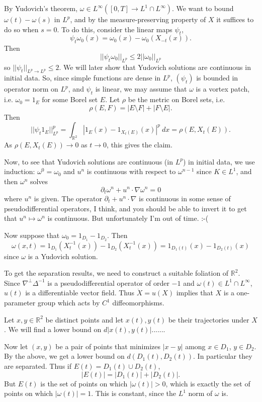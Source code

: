 \documentclass[10pt]{article}
\newcommand{\RR}{\mathbb{R}}
\theoremstyle{definition}
\begin{document}
By Yudovich's theorem, $\omega \in L^\infty([0, T] \to L^1 \cap L^\infty)$.
We want to bound $\omega(t) - \omega(s)$ in $L^p$, and by the measure-preserving property of $X$ it suffices to do so when $s = 0$.
To do this, consider the linear maps $\psi_t$,
$$\psi_t \omega_0(x) = \omega_0(x) - \omega_0(X_{-t}(x)).$$
Then
$$||\psi_t \omega_0||_{L^p} \leq 2||\omega_0||_{L^p}$$
so $||\psi_t||_{L^p \to L^p} \leq 2$.
We will later show that Yudovich solutions are continuous in initial data.
So, since simple functions are dense in $L^p$, $(\psi_t)$ is bounded in operator norm on $L^p$, and $\psi_t$ is linear, we may assume that $\omega$ is a vortex patch, i.e. $\omega_0 = 1_E$ for some Borel set $E$.
Let $\rho$ be the metric on Borel sets, i.e.
$$\rho(E, F) = |E \setminus F| + |F \setminus E|.$$
Then
$$||\psi_t 1_E||_{L^p}^p = \int_{\RR^2} |1_E(x) - 1_{X_t(E)}(x)|^p ~dx = \rho(E, X_t(E)).$$
As $\rho(E, X_t(E)) \to 0$ as $t \to 0$, this gives the claim.

Now, to see that Yudovich solutions are continuous (in $L^p$) in initial data, we use induction: $\omega^0 = \omega_0$ and $u^n$ is continuous with respect to $\omega^{n - 1}$ since $K \in L^1$, and then $\omega^n$ solves
$$\partial_t \omega^n + u^n \cdot \nabla \omega^n = 0$$
where $u^n$ is given. The operator $\partial_t + u^n \cdot \nabla$ is continuous in some sense of pseudodifferential operators, I think, and you should be able to invert it to get that $u^n \mapsto \omega^n$ is continuous.
But unfortunately I'm out of time. :-(



Now suppose that $\omega_0 = 1_{D_1} - 1_{D_2}$.
Then
$$\omega(x, t) = 1_{D_1}(X_t^{-1}(x)) - 1_{D_2}(X_t^{-1}(x)) = 1_{D_1(t)}(x) - 1_{D_2(t)}(x)$$
since $\omega$ is a Yudovich solution.

To get the separation results, we need to construct a suitable foliation of $\RR^2$.
Since $\nabla^\perp \Delta^{-1}$ is a pseudodifferential operator of order $-1$ and $\omega(t) \in L^1 \cap L^\infty$, $u(t)$ is a differentiable vector field.
Thus $\dot X = u(X)$ implies that $X$ is a one-parameter group which acts by $C^1$ diffeomorphisms.

Let $x,y \in \RR^2$ be distinct points and let $x(t),y(t)$ be their trajectories under $X$. We will find a lower bound on $d|x(t), y(t)|$.......

Now let $(x, y)$ be a pair of points that minimizes $|x - y|$ among $x \in D_1$, $y \in D_2$.
By the above, we get a lower bound on $d(D_1(t), D_2(t))$.
In particular they are separated.
Thus if $E(t) = D_1(t) \cup D_2(t)$,
$$|E(t)| = |D_1(t)| + |D_2(t)|.$$
But $E(t)$ is the set of points on which $|\omega(t)| > 0$, which is exactly the set of points on which $|\omega(t)| = 1$.
This is constant, since the $L^1$ norm of $\omega$ is.
\end{document}
